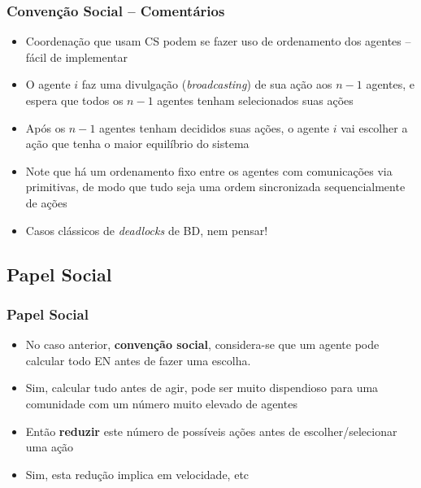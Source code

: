 \begin{frame}%
\frametitle{Convenção Social -- Comentários}

\begin{itemize}
  \item Coordenação que usam CS podem se fazer uso de ordenamento dos agentes -- fácil de implementar
  
  \item O agente $i$ faz uma divulgação (\textit{broadcasting}) de sua ação aos $n-1$ agentes, e espera   que todos os  $n-1$ agentes tenham selecionados suas ações
  
  \item Após os $n-1$ agentes tenham decididos suas ações, o agente $i$
  vai escolher a ação que tenha o maior equilíbrio do sistema
  
  \item Note que há um ordenamento fixo entre os agentes com comunicações via  primitivas, de modo que tudo seja uma ordem sincronizada sequencialmente de ações
  
  \item Casos clássicos de \textit{deadlocks} de BD, nem pensar!
  
\end{itemize}

\end{frame}




\subsection{Papel Social}

\begin{frame} %
\frametitle{Papel Social}

\begin{itemize}
  \item No caso anterior, \textbf{convenção social}, considera-se que um agente pode calcular 
  todo EN antes de fazer uma escolha.
  \item Sim, calcular tudo antes de agir, pode ser muito dispendioso para uma comunidade
com um número  muito elevado de agentes
   \item Então \textbf{reduzir} este número de possíveis ações antes de escolher/selecionar uma ação 
   \item Sim, esta redução implica em velocidade, etc



\end{itemize}

\end{frame}


